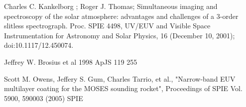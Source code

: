 \documentclass[]{aastex6}
\begin{document}
\begin{thebibliography}{}

 Charles C. Kankelborg ; Roger J. Thomas; Simultaneous imaging and spectroscopy of the solar atmosphere: advantages and challenges of a 3-order slitless spectrograph. Proc. SPIE 4498, UV/EUV and Visible Space Instrumentation for Astronomy and Solar Physics, 16 (December 10, 2001); doi:10.1117/12.450074.

 Jeffrey W. Brosius et al 1998 ApJS 119 255

  Scott M. Owens, Jeffery S. Gum, Charles Tarrio, et al., "Narrow-band EUV multilayer coating for the MOSES sounding rocket", Proceedings of SPIE Vol. 5900, 590003 (2005)   SPIE 




\end{thebibliography}{}	
	
\end{document}
